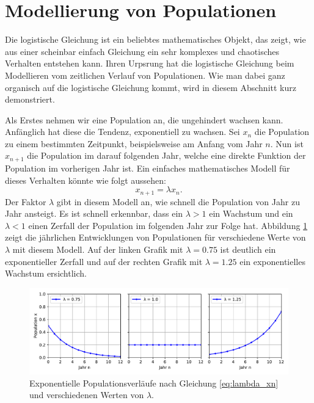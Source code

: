 %
%
%
\section{Modellierung von Populationen
\label{logistic:section:einleitung}}

Die logistische Gleichung ist ein beliebtes mathematisches Objekt,
das zeigt, wie aus einer scheinbar einfach Gleichung
ein sehr komplexes und chaotisches Verhalten entstehen kann. 
Ihren Urpsrung hat die logistische Gleichung beim Modellieren
vom zeitlichen Verlauf von Populationen. 
Wie man dabei ganz organisch auf die logistische Gleichung 
kommt, wird in diesem Abschnitt kurz demonstriert. 

Als Erstes nehmen wir eine Population an, 
die ungehindert wachsen kann. 
Anfänglich hat diese die Tendenz, exponentiell zu wachsen. 
Sei $x_{n}$ die Population zu einem bestimmten Zeitpunkt, 
beispielsweise am Anfang vom Jahr $n$. 
Nun ist $x_{n+1}$ die Population im darauf folgenden Jahr, 
welche eine direkte Funktion der Population im vorherigen
Jahr ist. 
Ein einfaches mathematisches Modell für dieses Verhalten
könnte wie folgt aussehen:
\begin{equation}
    \label{eq:lambda_xn}
    x_{n+1} = \lambda x_{n}\text{.}
\end{equation}
Der Faktor $\lambda$ gibt in diesem Modell an, 
wie schnell die Population von Jahr zu Jahr ansteigt. 
Es ist schnell erkennbar, 
dass ein $\lambda > 1$ ein Wachstum und
ein $\lambda < 1$ einen Zerfall
der Population im folgenden Jahr zur Folge hat. 
Abbildung \ref{fig:pop_exp} zeigt die jährlichen
Entwicklungen von Populationen für verschiedene
Werte von $\lambda$ mit diesem Modell.
Auf der linken Grafik mit $\lambda = 0.75$ ist deutlich
ein exponentieller Zerfall und auf 
der rechten Grafik mit $\lambda = 1.25$
ein exponentielles Wachstum ersichtlich.
\begin{figure}
    \includegraphics[width=\linewidth]{papers/logistic/figures/pop_exp.pdf}
    \caption{
        Exponentielle Populationsverläufe nach
        Gleichung \eqref{eq:lambda_xn}
        und verschiedenen Werten von $\lambda$.
    }
    \label{fig:pop_exp}
\end{figure}

